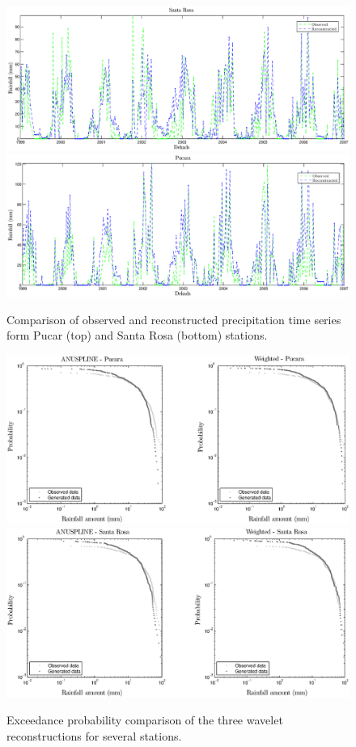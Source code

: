 \documentclass[10pt,letterpaper,conference]{ieeeconf}
\begin{document}
\begin{figure}[ht]
\begce
\includegraphics[width=\columnwidth]{SantaRosaTimeSeries}\\
\includegraphics[width=\columnwidth]{PucaraTimeSeries}
\endce
\caption{Comparison of observed and reconstructed precipitation time series 
form Pucar (top) and Santa Rosa (bottom) stations.}
\label{fig:PucStaRosTimeSeries}
\end{figure}
\begin{figure}[ht]
\begce
\includegraphics[width=\columnwidth]{ECDFcomparisonPucaraN}\\
\includegraphics[width=\columnwidth]{ECDFcomparisonSantaRosaN}
\endce
\caption{Exceedance probability comparison of the three wavelet reconstructions 
for several stations.}
\label{fig:3methodsComparison3}
\end{figure}
\end{document}
